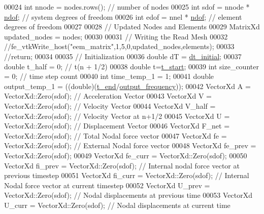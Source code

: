 \begin{DoxyCode}
00024     \textcolor{keywordtype}{int} nnode = nodes.rows(); \textcolor{comment}{// number of nodes}
00025     \textcolor{keywordtype}{int} sdof = nnode * \hyperlink{_global_variables_8h_aa789fe4d8a13fd0990b630909430d5d0}{ndof}; \textcolor{comment}{// system degrees of freedom}
00026     \textcolor{keywordtype}{int} edof = nnel * \hyperlink{_global_variables_8h_aa789fe4d8a13fd0990b630909430d5d0}{ndof}; \textcolor{comment}{// element degrees of freedom}
00027 
00028     \textcolor{comment}{// Updated Nodes and Elements}
00029     MatrixXd updated\_nodes = nodes;
00030 
00031     \textcolor{comment}{// Writing the Read Mesh}
00032     \textcolor{comment}{//fe\_vtkWrite\_host("eem\_matrix",1,5,0,updated\_nodes,elements);}
00033     \textcolor{comment}{//return;}
00034 
00035     \textcolor{comment}{// Initialization}
00036     \textcolor{keywordtype}{double} dT = \hyperlink{_global_variables_8h_a068c627ac33cf3c721d8f28eab205a83}{dt\_initial};
00037     \textcolor{keywordtype}{double} t\_half = 0; \textcolor{comment}{// t(n + 1/2)}
00038     \textcolor{keywordtype}{double} t=\hyperlink{_global_variables_8h_a1b01a4354147da92a548ea1a5f96d592}{t\_start};
00039     \textcolor{keywordtype}{int} size\_counter = 0; \textcolor{comment}{// time step count}
00040     \textcolor{keywordtype}{int} time\_temp\_1 = 1;
00041     \textcolor{keywordtype}{double} output\_temp\_1 = ((double)(\hyperlink{_global_variables_8h_a4b637c5fff609e604a3b2b2787f4a9fa}{t\_end}/\hyperlink{_global_variables_8h_ace6ace9b2f6d8d404ca9e66564289eb1}{output\_frequency}));
00042     VectorXd A = VectorXd::Zero(sdof); \textcolor{comment}{// Acceleration Vector}
00043     VectorXd V = VectorXd::Zero(sdof); \textcolor{comment}{// Velocity Vector}
00044     VectorXd V\_half = VectorXd::Zero(sdof); \textcolor{comment}{// Velocity Vector at n+1/2}
00045     VectorXd U = VectorXd::Zero(sdof); \textcolor{comment}{// Displacement Vector}
00046     VectorXd F\_net = VectorXd::Zero(sdof); \textcolor{comment}{// Total Nodal force vector}
00047     VectorXd fe = VectorXd::Zero(sdof); \textcolor{comment}{// External Nodal force vector}
00048     VectorXd fe\_prev = VectorXd::Zero(sdof);
00049     VectorXd fe\_curr = VectorXd::Zero(sdof);
00050     VectorXd fi\_prev = VectorXd::Zero(sdof); \textcolor{comment}{// Internal nodal force vector at previous timestep}
00051     VectorXd fi\_curr = VectorXd::Zero(sdof); \textcolor{comment}{// Internal Nodal force vector at current timestep}
00052     VectorXd U\_prev = VectorXd::Zero(sdof); \textcolor{comment}{// Nodal displacements at previous time}
00053     VectorXd U\_curr = VectorXd::Zero(sdof); \textcolor{comment}{// Nodal displacements at current time}

\end{DoxyCode}

